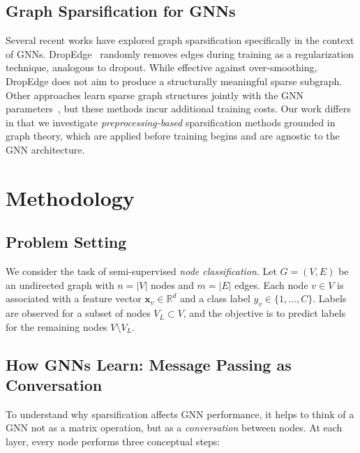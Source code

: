 \documentclass[conference]{IEEEtran}
\begin{document}
\subsection{Graph Sparsification for GNNs}

Several recent works have explored graph sparsification specifically in the context of GNNs. DropEdge~\cite{rong2020} randomly removes edges during training as a regularization technique, analogous to dropout. While effective against over-smoothing, DropEdge does not aim to produce a structurally meaningful sparse subgraph. Other approaches learn sparse graph structures jointly with the GNN parameters~\cite{zheng2020}, but these methods incur additional training costs. Our work differs in that we investigate \emph{preprocessing-based} sparsification methods grounded in graph theory, which are applied before training begins and are agnostic to the GNN architecture.

\section{Methodology}\label{sec:methodology}

\subsection{Problem Setting}

We consider the task of semi-supervised \emph{node classification}. Let $G = (V, E)$ be an undirected graph with $n = |V|$ nodes and $m = |E|$ edges. Each node $v \in V$ is associated with a feature vector $\mathbf{x}_v \in \mathbb{R}^d$ and a class label $y_v \in \{1, \dots, C\}$. Labels are observed for a subset of nodes $V_L \subset V$, and the objective is to predict labels for the remaining nodes $V \setminus V_L$.

\subsection{How GNNs Learn: Message Passing as Conversation}

To understand why sparsification affects GNN performance, it helps to think of a GNN not as a matrix operation, but as a \emph{conversation} between nodes. At each layer, every node performs three conceptual steps:
\end{document}

